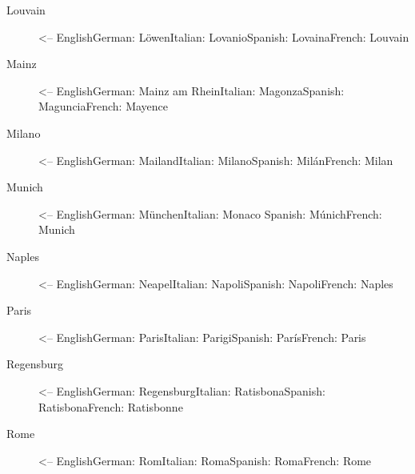 \documentclass[a4paper,
10pt,
greek,
french,
spanish,
italian,
ngerman,
english
]{ltxdoc}
\begin{document}
\begin{multicols}{3}
\begin{description}
\item[Louvain] <-- English\newline German: Löwen\newline Italian: Lovanio\newline Spanish: Lovaina\newline French: Louvain
\item[Mainz] <-- English\newline German: Mainz am Rhein\newline Italian: Magonza\newline Spanish: Maguncia\newline French: Mayence
\item[Milano] <-- English\newline German: Mailand\newline Italian: Milano\newline Spanish: Milán\newline French: Milan
\item[Munich] <-- English\newline German: München\newline Italian: Monaco \newline Spanish: Múnich\newline French: Munich
\item[Naples] <-- English\newline German: Neapel\newline Italian: Napoli\newline Spanish: Napoli\newline French: Naples
\item[Paris] <-- English\newline German: Paris\newline Italian: Parigi\newline Spanish: París\newline French: Paris
\item[Regensburg] <-- English\newline German: Regensburg\newline Italian: Ratisbona\newline Spanish: Ratisbona\newline French: Ratisbonne
\item[Rome] <-- English\newline German: Rom\newline Italian: Roma\newline Spanish: Roma\newline French: Rome

\end{description}
\end{multicols}
\end{document}
